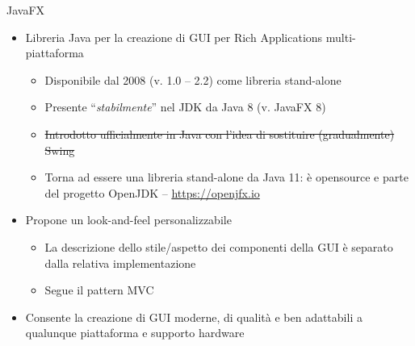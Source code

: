 \documentclass[xcolor=dvipsnames,presentation]{beamer}
\begin{document}
\begin{frame}{JavaFX}
\begin{itemize}\itemsep10pt
\item Libreria Java per la creazione di GUI per Rich Applications multi-piattaforma
\begin{itemize}
\item Disponibile dal 2008 (v. 1.0 -- 2.2) come libreria stand-alone
\item Presente ``\emph{stabilmente}'' nel JDK da Java 8 (v. JavaFX 8)
\item \st{Introdotto ufficialmente in Java con l'idea di sostituire (gradualmente) Swing}
\item Torna ad essere una libreria stand-alone da Java 11:
 è opensource e parte del progetto OpenJDK -- \url{https://openjfx.io}
\end{itemize}
\item Propone un look-and-feel personalizzabile
\begin{itemize}
\item La descrizione dello stile/aspetto dei componenti della GUI è separato dalla relativa implementazione
\item Segue il pattern MVC
\end{itemize}
\item Consente la creazione di GUI moderne, di qualità e ben adattabili a qualunque piattaforma e supporto hardware
\end{itemize}
\end{frame}

%
\end{document}

